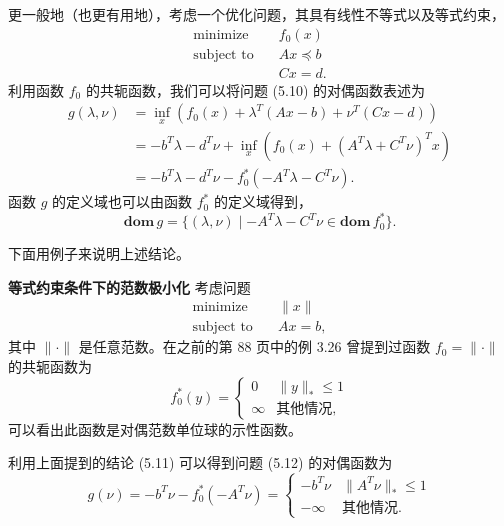 \documentclass[UTF8, 12pt, fontset=fandol, oneside]{ctexart}
\begin{document}
更一般地（也更有用地），考虑一个优化问题，其具有线性不等式以及等式约束，
\begin{equation}
\begin{aligned}
\text{minimize}\quad & f_0(x)\\
\text{subject to}\quad & Ax\preceq b\\
& Cx=d.
\end{aligned}
\tag{5.10}
\end{equation}
利用函数 $f_0$ 的共轭函数，我们可以将问题 (5.10) 的对偶函数表述为
\begin{equation}
\begin{aligned}
g(\lambda,\nu)
&=\inf_x\left(f_0(x)+\lambda^T(Ax-b)+\nu^T(Cx-d)\right)\\
&=-b^T\lambda-d^T\nu+\inf_x\left(f_0(x)+(A^T\lambda+C^T\nu)^Tx\right)\\
&=-b^T\lambda-d^T\nu-f_0^\ast(-A^T\lambda-C^T\nu).
\end{aligned}
\tag{5.11}
\end{equation}
函数 $g$ 的定义域也可以由函数 $f_0^\ast$ 的定义域得到，
\[
\mathbf{dom}\,g=\{(\lambda,\nu)\mid -A^T\lambda-C^T\nu\in\mathbf{dom}\,f_0^\ast\}.
\]

下面用例子来说明上述结论。

\noindent\textbf{等式约束条件下的范数极小化}\quad
考虑问题
\begin{equation}
\begin{aligned}
\text{minimize}\quad & \|x\|\\
\text{subject to}\quad & Ax=b,
\end{aligned}
\tag{5.12}
\end{equation}
其中 $\|\cdot\|$ 是任意范数。在之前的第 88 页中的例 3.26 曾提到过函数 $f_0=\|\cdot\|$ 的共轭函数为
\[
f_0^\ast(y)=
\begin{cases}
0 & \|y\|_\ast\leq 1\\
\infty & \text{其他情况},
\end{cases}
\]
可以看出此函数是对偶范数单位球的示性函数。

利用上面提到的结论 (5.11) 可以得到问题 (5.12) 的对偶函数为
\[
g(\nu)=-b^T\nu-f_0^\ast(-A^T\nu)
=
\begin{cases}
-b^T\nu & \|A^T\nu\|_\ast\leq 1\\
-\infty & \text{其他情况}.
\end{cases}
\]
\end{document}

